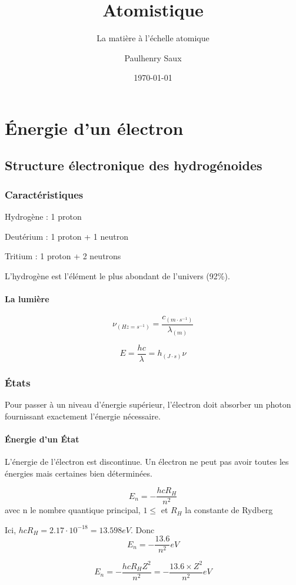 \documentclass[french]{yLectureNote}
\title{Atomistique}
\subtitle{La matière à l'échelle atomique}
\author{Paulhenry Saux}
\date{\today}
\begin{document}
\setcounter{chapter}{1}

	\chapter{Énergie d'un électron}

\section{Structure électronique des hydrogénoides}
\subsection{Caractéristiques}
Hydrogène : 1 proton

Deutérium : 1 proton + 1 neutron

Tritium : 1 proton + 2 neutrons

L'hydrogène est l'élément le plus abondant de l'univers (92\%).

\subsubsection{La lumière}
\begin{theorem}[Fréquence]
\[\nu_{(Hz = s^{-1})} = \frac{c_{(m\cdot s^{-1})}}{\lambda_{(m)}}\]
\end{theorem}

\begin{theorem}
\[E = \frac{hc}{\lambda} = h_{(J\cdot s)}\nu\]
\end{theorem}
\subsection{États}

Pour passer à un niveau d'énergie supérieur, l'électron doit absorber un photon fournissant exactement l'énergie nécessaire.
\subsubsection{Énergie d'un État}
L'énergie de l'électron est discontinue. Un électron ne peut pas avoir toutes les énergies mais certaines bien déterminées.
\begin{theorem}
\[E_n = -\frac{hcR_H}{n^2}\] avec n le nombre quantique principal, $1 \leq$ et $R_H$ la constante de Rydberg
\end{theorem}
Ici, $hcR_H = 2.17\cdot10^{-18} = 13.598eV$. Donc \[E_n = -\frac{13.6}{n^2}eV\]
\begin{theorem}
\[E_n = -\frac{hcR_HZ^2}{n^2} = -\frac{13.6\times Z^2}{n^2}eV\]
\end{theorem}
\end{document}
